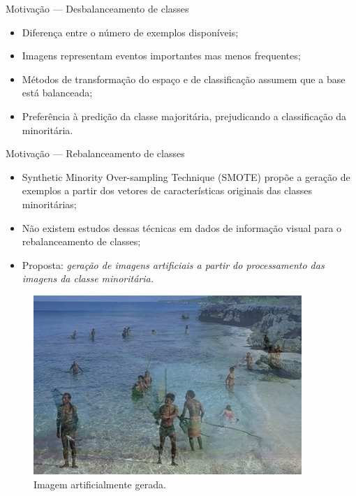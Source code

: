 \documentclass{beamer}
\begin{document}
\begin{frame}{Motivação --- Desbalanceamento de classes}
  \setlength\leftmargini{1em}
  \justifying
  \begin{itemize}
    \item Diferença entre o número de exemplos disponíveis;
    \item Imagens representam eventos importantes mas menos frequentes;
    \item Métodos de transformação do espaço e de
    classificação assumem que a base está balanceada;
    \item Preferência à predição da classe majoritária, prejudicando a classificação da minoritária.
  \end{itemize}
\end{frame}
\begin{frame}{Motivação --- Rebalanceamento de classes}
  \setlength\leftmargini{1em}
  \justifying
  \begin{itemize}
    \item Synthetic Minority Over-sampling Technique (SMOTE) propõe a geração de exemplos a partir dos vetores de características originais das classes minoritárias;
    \item Não existem estudos dessas técnicas em dados de informação visual para o rebalanceamento de classes;
    \item Proposta: \textit{geração de imagens artificiais a partir do processamento das imagens da classe minoritária.}
  \end{itemize}
  \begin{figure}[htbp]
    \begin{center}
      \includegraphics[width=.35\linewidth]{figuras/imagemgerada.jpg}
      \caption{Imagem artificialmente gerada.}
    \end{center}
  \end{figure}
\end{frame}
\end{document}
